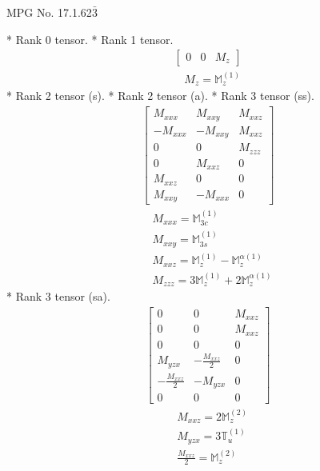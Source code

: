 \documentclass[fleqn,8pt,landscape]{jsarticle}
\begin{document}
\setcounter{MaxMatrixCols}{32}

\renewcommand{\tablename}{Table~}
\renewcommand{\figurename}{Figure~}
\begin{center}
\LARGE
MPG No. 17.1.62\quad$\bar{3}$
\end{center}
* Rank 0 tensor.
* Rank 1 tensor.
\begin{align*}
\begin{bmatrix} 0 & 0 & M_{z} \end{bmatrix}
\end{align*}
\begin{align*}
& M_{z} = \mathbb{M}_{z}^{(1)}
\end{align*}
* Rank 2 tensor (s).
* Rank 2 tensor (a).
* Rank 3 tensor (ss).
\begin{align*}
\begin{bmatrix} M_{xxx} & M_{xxy} & M_{xxz} \\ - M_{xxx} & - M_{xxy} & M_{xxz} \\ 0 & 0 & M_{zzz} \\ 0 & M_{xxz} & 0 \\ M_{xxz} & 0 & 0 \\ M_{xxy} & - M_{xxx} & 0 \end{bmatrix}
\end{align*}
\begin{align*}
& M_{xxx} = \mathbb{M}_{3c}^{(1)} \\
& M_{xxy} = \mathbb{M}_{3s}^{(1)} \\
& M_{xxz} = \mathbb{M}_{z}^{(1)} - \mathbb{M}_{z}^{\alpha(1)} \\
& M_{zzz} = 3 \mathbb{M}_{z}^{(1)} + 2 \mathbb{M}_{z}^{\alpha(1)}
\end{align*}
* Rank 3 tensor (sa).
\begin{align*}
\begin{bmatrix} 0 & 0 & M_{xxz} \\ 0 & 0 & M_{xxz} \\ 0 & 0 & 0 \\ M_{yzx} & - \frac{M_{xxz}}{2} & 0 \\ - \frac{M_{xxz}}{2} & - M_{yzx} & 0 \\ 0 & 0 & 0 \end{bmatrix}
\end{align*}
\begin{align*}
& M_{xxz} = 2 \mathbb{M}_{z}^{(2)} \\
& M_{yzx} = 3 \mathbb{T}_{u}^{(1)} \\
& \frac{M_{xxz}}{2} = \mathbb{M}_{z}^{(2)}
\end{align*}
\end{document}
